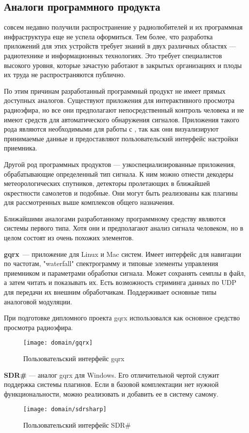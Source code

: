 \subsection{Аналоги программного продукта}

\SDR совсем недавно получили распространение у радиолюбителей и их программная инфраструктура еще не успела оформиться. \cite{sdr_reddit} Тем более, что разработка приложений для этих устройств требует знаний в двух различных областях --- радиотехнике и информационных технологиях. Это требует специалистов высокого уровня, которые зачастую работают в закрытых организациях и плоды их труда не распространяются публично.

По этим причинам разработанный программный продукт не имеет прямых доступных аналогов. Существуют приложения для интерактивного просмотра радиоэфира, но все они предполагают непосредственный контроль человека и не имеют средств для автоматического обнаружения сигналов. Приложения такого рода являются необходимыми для работы с \SDR, так как они визуализируют принимаемые данные и предоставляют пользовательский интерфейс настройки приемника.

Другой род программных продуктов --- узкоспециализированные приложения, обрабатывающие определенный тип сигнала. К ним можно отнести декодеры метеорологических спутников, детекторы пролетающих в ближайшей окрестности самолетов и подобные. Они могут быть реализованы как плагины для рассмотренных выше комплексов общего назначения.

Ближайшими аналогами разработанному программному средству являются системы первого типа. Хотя они и предполагают анализ сигнала человеком, но в целом состоят из очень похожих элементов.

\textbf{gqrx}\ --- приложение для Linux и Mac систем. Имеет интерфейс для навигации по частотам, "waterfall" спектрограмму и типовые элементы управления приемником и параметрами обработки сигнала. Может сохранять семплы в файл, а затем читать и показывать их. Есть возможность стриминга данных по UDP для передачи их внешним обработчикам. Поддерживает основные типы аналоговой модуляции.

При подготовке дипломного проекта gqrx использовался как основное средство просмотра радиоэфира.

\begin{figure}[h]
  \centering
  \texttt{[image: domain/gqrx]}
  \caption{Пользовательский интерфейс gqrx}
  \label{fig:domain:gqrx}
\end{figure}

\textbf{SDR\#} --- аналог gqrx для Windows. Его отличительной чертой служит поддержка системы плагинов. Если в базовой комплектации нет нужной функциональности, можно реализовать и добавить ее в систему самому.

\begin{figure}[h]
  \centering
  \texttt{[image: domain/sdrsharp]}
  \caption{Пользовательский интерфейс SDR\#}
  \label{fig:domain:sdrsharp}
\end{figure}
